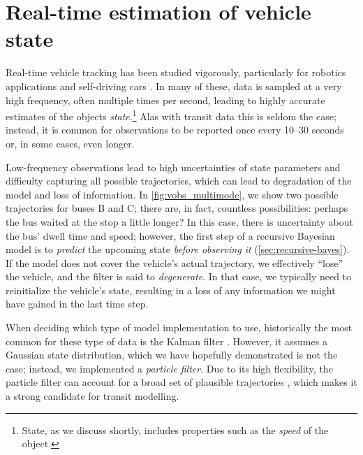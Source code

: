 \section{Real-time estimation of vehicle state}
\label{sec:vehicle_model}
Real-time vehicle tracking has been studied vigorously, particularly for robotics applications and self-driving cars \citep{Daum_2005,Gustafsson_2002}. In many of these, data is sampled at a very high frequency, often multiple times per second, leading to highly accurate estimates of the objects \emph{state}.\footnote{State, as we discuss shortly, includes properties such as the \emph{speed} of the object.} Alas with transit data this is seldom the case; instead, it is common for observations to be reported once every 10--30 seconds or, in some cases, even longer.

Low-frequency observations lead to high uncertainties of state parameters and difficulty capturing all possible trajectories, which can lead to degradation of the model and loss of information. In \cref{fig:vobs_multimode}, we show two possible trajectories for buses B and C; there are, in fact, countless possibilities: perhaps the bus waited at the stop a little longer? In this case, there is uncertainty about the bus' dwell time and speed; however, the first step of a recursive Bayesian model is to \emph{predict} the upcoming state \emph{before observing it} (\cref{sec:recursive-bayes}). If the model does not cover the vehicle's actual trajectory, we effectively ``lose'' the vehicle, and the filter is said to \emph{degenerate}. In that case, we typically need to reinitialize the vehicle's state, resulting in a loss of any information we might have gained in the last time step.

When deciding which type of model implementation to use, historically the most common for these type of data is the Kalman filter \citep{Wall_1999,Dailey_2001,Cathey_2003}. However, it assumes a Gaussian state distribution, which we have hopefully demonstrated is not the case; instead, we implemented a \emph{particle filter}. Due to its high flexibility, the particle filter can account for a broad set of plausible trajectories \citep{Hans_2015}, which makes it a strong candidate for transit modelling.

